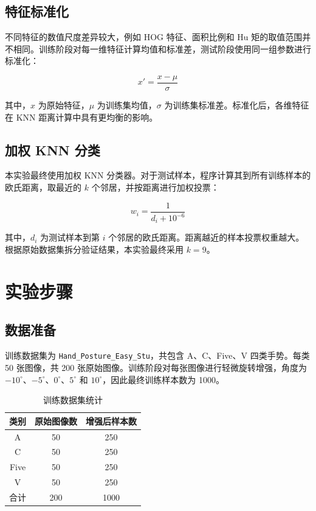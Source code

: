 \documentclass[11pt]{article}
\begin{document}
\subsection{特征标准化}

不同特征的数值尺度差异较大，例如 HOG 特征、面积比例和 Hu 矩的取值范围并不相同。训练阶段对每一维特征计算均值和标准差，测试阶段使用同一组参数进行标准化：

\begin{equation}
    x' = \frac{x-\mu}{\sigma}
\end{equation}

其中，$x$ 为原始特征，$\mu$ 为训练集均值，$\sigma$ 为训练集标准差。标准化后，各维特征在 KNN 距离计算中具有更均衡的影响。

\subsection{加权 KNN 分类}

本实验最终使用加权 KNN 分类器。对于测试样本，程序计算其到所有训练样本的欧氏距离，取最近的 $k$ 个邻居，并按距离进行加权投票：

\begin{equation}
    w_i = \frac{1}{d_i + 10^{-6}}
\end{equation}

其中，$d_i$ 为测试样本到第 $i$ 个邻居的欧氏距离。距离越近的样本投票权重越大。根据原始数据集拆分验证结果，本实验最终采用 $k=9$。

\section{实验步骤}

\subsection{数据准备}

训练数据集为 \texttt{Hand\_Posture\_Easy\_Stu}，共包含 A、C、Five、V 四类手势。每类 50 张图像，共 200 张原始图像。训练阶段对每张图像进行轻微旋转增强，角度为 $-10^\circ$、$-5^\circ$、$0^\circ$、$5^\circ$ 和 $10^\circ$，因此最终训练样本数为 1000。

\begin{table}[H]
\centering
\caption{训练数据集统计}
\begin{tabular}{ccc}
\toprule
类别 & 原始图像数 & 增强后样本数 \\
\midrule
A & 50 & 250 \\
C & 50 & 250 \\
Five & 50 & 250 \\
V & 50 & 250 \\
\midrule
合计 & 200 & 1000 \\
\bottomrule
\end{tabular}
\end{table}
\end{document}
